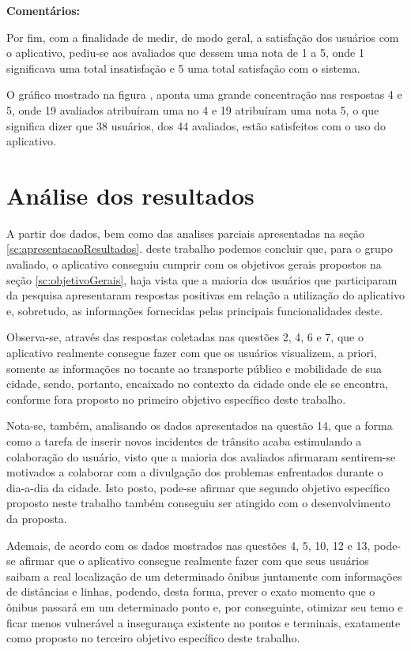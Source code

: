 \textbf{Comentários:}

Por fim, com a finalidade de medir, de modo geral, a satisfação dos usuários com o aplicativo, pediu-se aos avaliados que dessem uma nota de 1 a 5, onde 1 significava uma total insatisfação e 5 uma total satisfação com o sistema. 
	
O gráfico mostrado na figura , aponta uma grande concentração nas respostas 4 e 5, onde 19 avaliados atribuíram uma no 4 e 19 atribuíram uma nota 5, o que significa dizer que 38 usuários, dos 44 avaliados, estão satisfeitos com o uso do aplicativo.\newline

\section{Análise dos resultados}
\label{sc:analiseResultados}

A partir dos dados, bem como das analises parciais apresentadas na seção \ref{sc:apresentacaoResultados}. deste trabalho podemos concluir que, para o grupo avaliado, o aplicativo conseguiu cumprir com os objetivos gerais propostos na seção \ref{sc:objetivoGerais}, haja vista que a maioria dos usuários que participaram da pesquisa apresentaram respostas positivas em relação a utilização do aplicativo e, sobretudo, as informações fornecidas pelas principais funcionalidades deste.
	
Observa-se, através das respostas coletadas nas questões  2, 4, 6 e 7, que o aplicativo realmente consegue fazer com que os usuários visualizem, a priori, somente as informações no tocante ao transporte público e mobilidade de sua cidade, sendo, portanto, encaixado no contexto da cidade onde ele se encontra, conforme fora proposto no primeiro objetivo específico deste trabalho. 
	
Nota-se, também, analisando os dados apresentados na questão 14, que a forma como a tarefa de inserir novos incidentes de trânsito acaba estimulando a colaboração do usuário, visto que a maioria dos avaliados afirmaram sentirem-se motivados a colaborar com a divulgação dos problemas enfrentados durante o dia-a-dia da cidade. Isto posto, pode-se afirmar que segundo objetivo específico proposto neste trabalho também conseguiu ser atingido com o desenvolvimento da proposta.
	
Ademais, de acordo com os dados mostrados nas questões 4, 5, 10, 12 e 13, pode-se afirmar que o aplicativo consegue realmente fazer com que seus usuários saibam a real localização de um determinado ônibus juntamente com informações de distâncias e linhas, podendo, desta forma, prever o exato momento que o ônibus passará em um determinado ponto e, por conseguinte, otimizar seu temo e ficar menos vulnerável a insegurança existente no pontos e terminais, exatamente como proposto no terceiro objetivo específico deste trabalho. 

